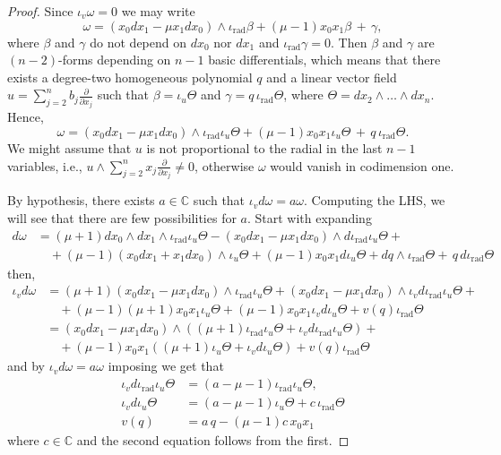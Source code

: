 \documentclass[10pt,a4paper]{amsart}
\def\CC{{\mathbb{C}}}
\newcommand{\del}[1]{\frac{\partial}{\partial #1}}
\DeclareMathOperator{\rad}{rad}
\begin{document}
\begin{proof}
 Since $\iota_v\omega = 0$ we may write  
 \[
 \omega = (x_0 dx_1 - \mu x_1 dx_0) \wedge \iota_{\rad}\beta + (\mu-1)x_0x_1\beta \, + \, \gamma,
 \]
 where $\beta$ and $\gamma$ do not depend on $dx_0$ nor $dx_1$ and $\iota_{\rad}\gamma = 0$. Then $\beta$ and $\gamma$ are $(n-2)$-forms depending on $n-1$ basic differentials, which means that there exists a degree-two homogeneous polynomial $q$ and a linear vector field $u = \sum_{j=2}^n b_j \del{ x_j}$ such that $\beta = \iota_u \Theta$ and $\gamma = q \, \iota_{\rad}\Theta$, where $\Theta = dx_2 \wedge \dots \wedge dx_n$. Hence,
 \[
 \omega = (x_0 dx_1 - \mu x_1 dx_0) \wedge \iota_{\rad}\iota_{u} \Theta + (\mu-1)x_0x_1\iota_u \Theta \, + \,q \, \iota_{\rad}\Theta.
 \]
 We might assume that $u$ is not proportional to the radial in the last $n-1$ variables, i.e., $u\wedge \sum_{j=2}^n x_j \del{ x_j} \neq 0$, otherwise $\omega$ would vanish in codimension one. 
 
 By hypothesis, there exists $a\in \CC$ such that $\iota_v d\omega = a \omega$. Computing the LHS, we will see that there are few possibilities for $a$. Start with expanding 
 \begin{align*}
 d\omega & = (\mu+1)dx_0 \wedge dx_1 \wedge \iota_{\rad}\iota_u \Theta - (x_0 dx_1 - \mu x_1 dx_0) \wedge d\iota_{\rad}\iota_u \Theta +\\ & \quad + (\mu-1)(x_0dx_1+x_1dx_0)\wedge \iota_u \Theta + (\mu-1)x_0x_1d\iota_u \Theta + dq\wedge \iota_{\rad}\Theta + \, q \, d\iota_{\rad}\Theta 
 \end{align*}
 then, 
 \begin{align*}
 \iota_vd\omega & = (\mu+1)(x_0 dx_1 - \mu x_1 dx_0)\wedge \iota_{\rad}\iota_u \Theta + (x_0 dx_1 - \mu x_1 dx_0) \wedge \iota_v d\iota_{\rad}\iota_u \Theta + \\ & \quad + (\mu-1)(\mu+1)x_0x_1\iota_u \Theta +(\mu-1)x_0x_1 \iota_v d\iota_u \Theta + v(q)\iota_{\rad}\Theta \\
 & = (x_0 dx_1 - \mu x_1 dx_0)\wedge ((\mu+1)\iota_{\rad}\iota_u \Theta + \iota_v d\iota_{\rad}\iota_u \Theta)+ \\ & \quad + (\mu-1)x_0x_1( (\mu+1)\iota_u \Theta + \iota_v d\iota_u \Theta) + v(q)\iota_{\rad}\Theta 
 \end{align*}
 and by $\iota_v d\omega = a \omega$ imposing we get that 
 \begin{align*}
 \iota_v d\iota_{\rad} \iota_u \Theta &= (a-\mu-1)\iota_{\rad} \iota_u \Theta, \\
 \iota_v d\iota_u \Theta &= (a-\mu-1) \iota_u \Theta + c\, \iota_{\rad} \Theta \\
 v(q) &= a \, q -(\mu-1)c \, x_0x_1
 \end{align*}
 where $c\in \CC$ and the second equation follows from the first. 
 

\end{proof}
\end{document}
